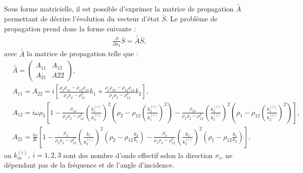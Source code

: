 \documentclass[12pt]{report}
\begin{document}
    Sous forme matricielle, il est possible d'exprimer la matrice de propagation $\bar{\bar{A}}$ permettant de décrire l'évolution du vecteur d'état $\bar{S}$. Le problème de propagation prend donc la forme suivante :
    \begin{align}
    \frac{\partial}{\partial x_3}\bar{S} = \bar{\bar{A}} \bar{S},\label{Equa_diff}
    \end{align}
    avec $\bar{\bar{A}}$ la matrice de propagation telle que :
     \begin{align}
     &\bar{\bar{A}}=\begin{pmatrix}
    				A_{11} & A_{12} \\ A_{21} & A{22}
    			\end{pmatrix}\label{Matrice_complete},\\ 
     &A_{11}=A_{22}=i[\frac{\rho_2\rho_{13}-\rho_{12}\rho_{23}}{\rho_1\rho_2-\rho_{12}^2}k_1+\frac{\rho_1\rho_{23}-\rho_{12}\rho_{13}}{\rho_1\rho_2-\rho_{12}^2}k_2], \\
     &A_{12}=i\omega \rho_3[1-\frac{\rho_{13}}{\rho_1\rho_2-\rho_{12}^2}(\frac{k_1^{(i)}}{k_3^{(i)}})^2(\rho_2-\rho_{12}(\frac{k_2^{(i)}}{k_1^{(i)}})^2)-\frac{\rho_{23}}{\rho_1\rho_2-\rho_{12}^2}(\frac{k_2^{(i)}}{k_3^{(i)}})^2(\rho_1-\rho_{12}(\frac{k_1^{(i)}}{k_2^{(i)}})^2)], \\
     &A_{21}=\frac{i\omega}{K}[1-\frac{\rho_3}{\rho_1\rho_2-\rho_{12}^2}(\frac{k_1}{k_3^{(i)}})^2(\rho_2-\rho_{12}\frac{k_2}{k_1})-\frac{\rho_3}{\rho_1\rho_2-\rho_{12}^2}(\frac{k_2}{k_3^{(i)}})^2(\rho_1-\rho_{12}\frac{k_1}{k_2})],
    \end{align}
    ou $k_m^{(i)},\ i=1,2,3$ sont des nombre d'onde effectif selon la direction $x_i$, ne dépendant pas de la fréquence et de l'angle d'incidence.
    
\end{document}
